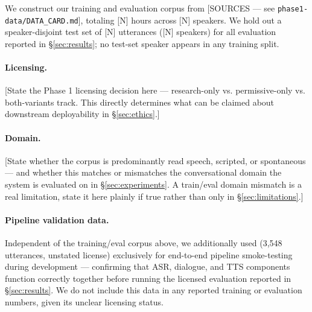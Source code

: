 
We construct our training and evaluation corpus from [SOURCES — see
\texttt{phase1-data/DATA\_CARD.md}], totaling [N] hours across [N] speakers.
We hold out a speaker-disjoint test set of [N] utterances ([N] speakers)
for all evaluation reported in \S\ref{sec:results}; no test-set speaker
appears in any training split.

\paragraph{Licensing.} [State the Phase 1 licensing decision here —
research-only vs. permissive-only vs. both-variants track. This directly
determines what can be claimed about downstream deployability in
\S\ref{sec:ethics}.]

\paragraph{Domain.} [State whether the corpus is predominantly read speech,
scripted, or spontaneous — and whether this matches or mismatches the
conversational domain the system is evaluated on in \S\ref{sec:experiments}.
A train/eval domain mismatch is a real limitation, state it here plainly if
true rather than only in \S\ref{sec:limitations}.]

\paragraph{Pipeline validation data.} Independent of the training/eval
corpus above, we additionally used \citet{shunyalabs-yoruba} (3{,}548
utterances, unstated license) exclusively for end-to-end pipeline
smoke-testing during development --- confirming that ASR, dialogue, and TTS
components function correctly together before running the licensed
evaluation reported in \S\ref{sec:results}. We do not include this data in
any reported training or evaluation numbers, given its unclear licensing
status.
